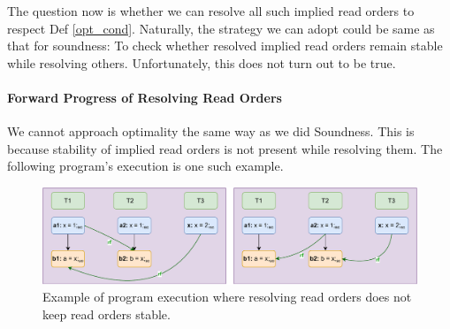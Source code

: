 %
%
%
%

        The question now is whether we can resolve all such implied read orders to respect Def \ref{opt_cond}. 
        Naturally, the strategy we can adopt could be same as that for soundness: To check whether resolved implied read orders remain stable while resolving others. 
        Unfortunately, this does not turn out to be true.
    

    \paragraph{Forward Progress of Resolving Read Orders}

        We cannot approach optimality the same way as we did Soundness.
        This is because stability of implied read orders is not present while resolving them.
        The following program's execution is one such example.
        
        \begin{figure}
            \centering
            \includegraphics{Equivalence_Example.pdf}
            \caption{Example of program execution where resolving read orders does not keep read orders stable.}
            \label{read_ord:instability}
        \end{figure}

